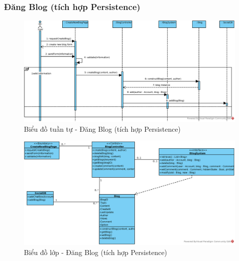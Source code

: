 \documentclass[./../main.tex]{subfiles}
\begin{document}
\subsubsection{Đăng Blog (tích hợp Persistence)}
\begin{figure}[H]
    \centering
    \includegraphics[width=\linewidth]{./images/UseCaseDesignDiagram/ucr_per_create_blog.eps}
    \caption{Biểu đồ tuần tự - Đăng Blog (tích hợp Persistence)}
\end{figure}
\begin{figure}[H]
    \centering
    \includegraphics[width=\linewidth]{./images/UseCaseDesignDiagram/ucd_per_blog.eps}
    \caption{Biểu đồ lớp - Đăng Blog (tích hợp Persistence)}
\end{figure}
\end{document}

